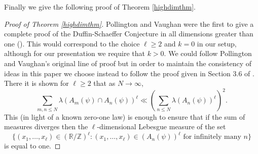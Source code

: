 \documentclass[12pt,reqno]{amsart}
\begin{document}
Finally we give the following proof of Theorem \ref{highdimthm}.
\begin{proof}[Proof of Theorem \ref{highdimthm}]
Pollington and Vaughan were the first to give a complete proof of the Duffin-Schaeffer Conjecture in all dimensions greater than one (\cite{VaughanPollington}). This would correspond to the choice $\ell\ge 2$ and $k=0$ in our setup, although for our presentation we require that $k>0$. We could follow Pollington and Vaughan's original line of proof but in order to maintain the consistency of ideas in this paper we choose instead to follow the proof given in Section 3.6 of \cite{HarmanMNT}. There it is shown for $\ell\ge 2$ that as $N{\rightarrow}\infty$,
\begin{equation}\label{pollvaughbound1}
\sum_{m,n\le N}\lambda (A_m(\psi)\cap A_n(\psi))^\ell\ll\left(\sum_{n\le N}\lambda (A_n(\psi))^\ell\right)^2.
\end{equation}
This (in light of a known zero-one law) is enough to ensure that if the sum of measures diverges then the $\ell$-dimensional Lebesgue measure of the set
\[\{(x_1,\ldots ,x_\ell)\in({\mathbb{R}}/{\mathbb{Z}})^\ell:(x_1,\ldots ,x_\ell)\in (A_n (\psi))^\ell\text{ for infinitely many } n\}\]
is equal to one.


\end{proof}
\end{document}
